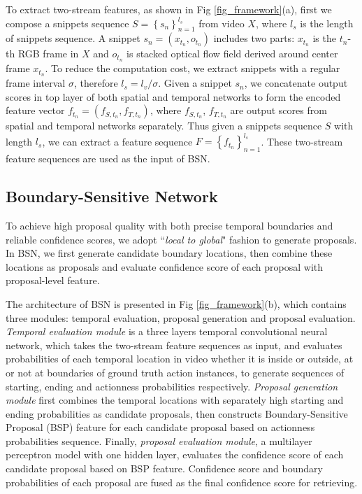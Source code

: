 \documentclass[runningheads]{llncs}
\begin{document}
To extract two-stream features, as shown in Fig \ref{fig_framework}(a), first we compose a snippets sequence $S=\left \{ s_n \right \}_{n=1}^{l_s}$ from video $X$, where $l_s$ is the length of snippets sequence.  A snippet $s_n=(x_{t_n}, o_{t_n})$ includes two parts: $x_{t_n}$ is the $t_n$-th RGB frame in $X$ and $o_{t_n}$ is stacked optical flow field derived around center frame $x_{t_n}$.
To reduce the computation cost, we extract snippets with a regular frame interval $\sigma $, therefore  $l_s=l_v/\sigma$.
Given a snippet $s_n$, we concatenate output scores in top layer of both spatial and temporal networks to form the encoded feature vector $f_{t_n}=(f_{S,t_n},f_{T,t_n})$, where $f_{S,t_n}$, $f_{T,t_n}$ are output scores from spatial and temporal networks separately.
Thus given a snippets sequence $S$ with length $l_s$, we can extract a feature sequence $F=\left \{ f_{t_n} \right \}_{n=1}^{l_s}$. These two-stream feature sequences are used as the input of BSN.



\subsection{Boundary-Sensitive Network}

To achieve high proposal quality with both precise temporal boundaries and reliable confidence scores, we adopt ``\emph{local to global}" fashion to generate proposals. In BSN, we first generate candidate boundary locations, then combine these locations as proposals and evaluate confidence score of each proposal with proposal-level feature.


The architecture of BSN is presented in Fig \ref{fig_framework}(b), which contains three modules: temporal evaluation, proposal generation  and proposal evaluation.
\emph{Temporal evaluation module} is a three layers temporal convolutional neural network, which  takes the two-stream feature sequences as input, and evaluates probabilities of each temporal location in video whether it is inside or outside, at or not at boundaries of ground truth action instances, to generate sequences of starting, ending and actionness probabilities respectively. %
\emph{Proposal generation module} first combines the temporal locations with separately high starting and ending probabilities as candidate proposals, then constructs Boundary-Sensitive Proposal (BSP) feature for each candidate proposal based on  actionness probabilities sequence.
Finally, \emph{proposal evaluation module}, a multilayer perceptron model with one hidden layer, evaluates the confidence score of each candidate proposal based on BSP feature.
Confidence score and boundary probabilities of each proposal are fused as the final confidence score for retrieving.
\end{document}
